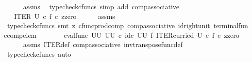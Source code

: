 \begin{isabellebody}
\ \ \ \ \isamarkupfalse%
\ assms\ \isamarkupfalse%
\ {\isacharparenleft}{\kern0pt}typecheck{\isacharunderscore}{\kern0pt}cfuncs{\isacharcomma}{\kern0pt}\ simp\ add{\isacharcolon}{\kern0pt}\ comp{\isacharunderscore}{\kern0pt}associative{}{\isacharparenright}{\kern0pt}\isanewline
\ \ \isamarkupfalse%
\ \isamarkupfalse%
\ {\isachardoublequoteopen}{\isachardot}{\kern0pt}{\isachardot}{\kern0pt}{\isachardot}{\kern0pt}\ {\isacharequal}{\kern0pt}\ ITER\ U\ {\isasymcirc}\isactrlsub c\ {\isasymlangle}f\ {\isasymcirc}\isactrlsub c\ z{\isacharcomma}{\kern0pt}zero{\isasymrangle}{\isachardoublequoteclose}\isanewline
\ \ \ \ \isamarkupfalse%
\ assms\ \isamarkupfalse%
\ {\isacharparenleft}{\kern0pt}typecheck{\isacharunderscore}{\kern0pt}cfuncs{\isacharcomma}{\kern0pt}\ smt\ {\isacharparenleft}{\kern0pt}z{}{\isacharparenright}{\kern0pt}\ cfunc{\isacharunderscore}{\kern0pt}prod{\isacharunderscore}{\kern0pt}comp\ comp{\isacharunderscore}{\kern0pt}associative{}\ id{\isacharunderscore}{\kern0pt}right{\isacharunderscore}{\kern0pt}unit{}\ terminal{\isacharunderscore}{\kern0pt}func{\isacharunderscore}{\kern0pt}comp{\isacharunderscore}{\kern0pt}elem{\isacharparenright}{\kern0pt}\isanewline
\ \ \isamarkupfalse%
\ \isamarkupfalse%
\ {\isachardoublequoteopen}{\isachardot}{\kern0pt}{\isachardot}{\kern0pt}{\isachardot}{\kern0pt}\ {\isacharequal}{\kern0pt}\ {\isacharparenleft}{\kern0pt}eval{\isacharunderscore}{\kern0pt}func\ {\isacharparenleft}{\kern0pt}U\isactrlbsup U\isactrlesup {\isacharparenright}{\kern0pt}\ {\isacharparenleft}{\kern0pt}U\isactrlbsup U\isactrlesup {\isacharparenright}{\kern0pt}{\isacharparenright}{\kern0pt}\ {\isasymcirc}\isactrlsub c\ {\isacharparenleft}{\kern0pt}id\isactrlsub c\ {\isacharparenleft}{\kern0pt}U\isactrlbsup U\isactrlesup {\isacharparenright}{\kern0pt}\ {\isasymtimes}\isactrlsub f\ ITER{\isacharunderscore}{\kern0pt}curried\ U{\isacharparenright}{\kern0pt}\ {\isasymcirc}\isactrlsub c\ {\isasymlangle}f\ {\isasymcirc}\isactrlsub c\ z{\isacharcomma}{\kern0pt}zero{\isasymrangle}{\isachardoublequoteclose}\isanewline
\ \ \ \ \isamarkupfalse%
\ assms\ ITER{\isacharunderscore}{\kern0pt}def\ comp{\isacharunderscore}{\kern0pt}associative{}\ inv{\isacharunderscore}{\kern0pt}transpose{\isacharunderscore}{\kern0pt}func{\isacharunderscore}{\kern0pt}def{}\ \isamarkupfalse%
\ {\isacharparenleft}{\kern0pt}typecheck{\isacharunderscore}{\kern0pt}cfuncs{\isacharcomma}{\kern0pt}\ auto{\isacharparenright}{\kern0pt}\isanewline

\end{isabellebody}
